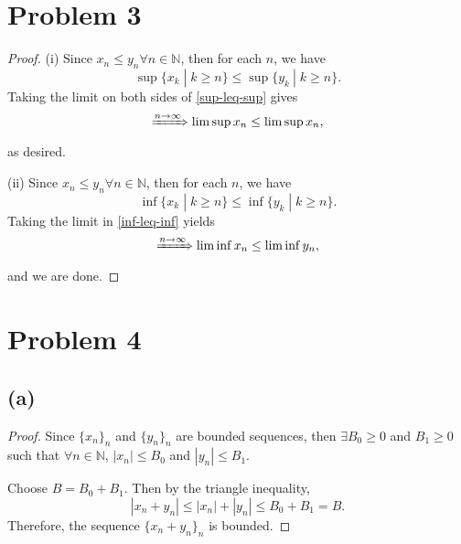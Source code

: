 \documentclass{article}
\begin{document}
\section*{Problem 3}
\begin{proof}
	(i) Since $x_n \leq y_n \forall n\in\mathbb{N}$, then for each $n$, we have
	\begin{equation}\label{sup-leq-sup}
		\sup \{x_k \;|\; k\geq n\} \leq \sup \{y_k \:|\; k\geq n\}.
	\end{equation}
	Taking the limit on both sides of \eqref{sup-leq-sup} gives
	\begin{equation}
		\xRightarrow{n\to\infty} \limsup x_n \leq \limsup x_n,
	\end{equation}
	as desired.
	
	(ii) Since $x_n \leq y_n \forall n \in \mathbb{N}$, then for each $n$, we have
	\begin{equation}\label{inf-leq-inf}
		\inf\{x_k \;|\; k\geq n\} \leq \inf \{y_k \;|\; k\geq n\}.
	\end{equation}
	Taking the limit in \eqref{inf-leq-inf} yields
	\begin{equation}
		\xRightarrow{n \to\infty} \liminf x_n \leq \liminf y_n,
	\end{equation}
	and we are done.
\end{proof}
\section*{Problem 4}
\subsection*{(a)}
\begin{proof}
	Since $\{x_n\}_n$ and $\{y_n\}_n$ are bounded sequences, then $\exists B_0 \geq 0$ and $B_1 \geq 0$ such that $\forall n \in \mathbb{N}$, $|x_n| \leq B_0$ and $|y_n| \leq B_1$.
	
	Choose $B = B_0 + B_1$. Then by the triangle inequality,
	\begin{equation}
		|x_n + y_n| \leq |x_n| + |y_n| \leq B_0 + B_1 = B.
	\end{equation}
	Therefore, the sequence $\{x_n + y_n\}_n$ is bounded.
\end{proof}
\end{document}
